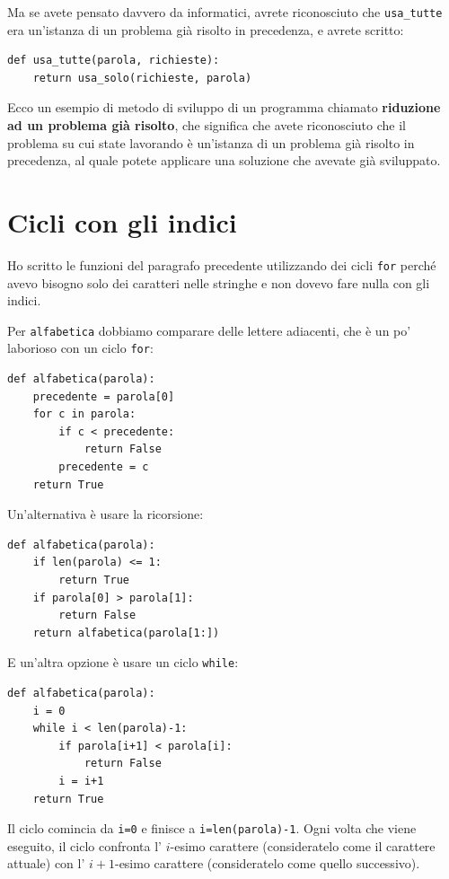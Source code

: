 \documentclass[10pt]{book}
\begin{document}
Ma se avete pensato davvero da informatici, avrete riconosciuto che \verb"usa_tutte" era un'istanza di un problema già risolto in precedenza, e avrete scritto:

\begin{verbatim}
def usa_tutte(parola, richieste):
    return usa_solo(richieste, parola)
\end{verbatim}
%
Ecco un esempio di metodo di sviluppo di un programma chiamato {\bf riduzione ad un problema già risolto}, che significa che avete riconosciuto che il problema su cui state lavorando è un'istanza di un problema già risolto in precedenza, al quale potete applicare una soluzione che avevate già sviluppato.


\section{Cicli con gli indici}

Ho scritto le funzioni del paragrafo precedente utilizzando dei cicli {\tt for}
perché avevo bisogno solo dei caratteri nelle stringhe e non dovevo fare nulla con gli indici.

Per \verb"alfabetica" dobbiamo comparare delle lettere adiacenti, che è un po' laborioso con un ciclo {\tt for}:

\begin{verbatim}
def alfabetica(parola):
    precedente = parola[0]
    for c in parola:
        if c < precedente:
            return False
        precedente = c
    return True
\end{verbatim}


Un'alternativa è usare la ricorsione:

\begin{verbatim}
def alfabetica(parola):
    if len(parola) <= 1:
        return True
    if parola[0] > parola[1]:
        return False
    return alfabetica(parola[1:])
\end{verbatim}

E un'altra opzione è usare un ciclo {\tt while}:

\begin{verbatim}
def alfabetica(parola):
    i = 0
    while i < len(parola)-1:
        if parola[i+1] < parola[i]:
            return False
        i = i+1
    return True
\end{verbatim}
%
Il ciclo comincia da {\tt i=0} e finisce a {\tt i=len(parola)-1}.  Ogni volta che viene eseguito, il ciclo confronta l' $i$-esimo carattere (consideratelo come il carattere attuale) con l' $i+1$-esimo carattere (consideratelo come quello successivo).
\end{document}
